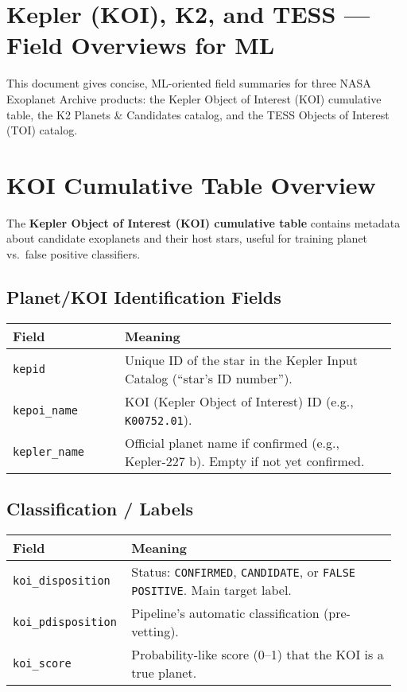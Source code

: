 \documentclass{article}
\begin{document}
\section*{Kepler (KOI), K2, and TESS --- Field Overviews for ML}

This document gives concise, ML-oriented field summaries for three NASA Exoplanet Archive products: the Kepler Object of Interest (KOI) cumulative table, the K2 Planets \& Candidates catalog, and the TESS Objects of Interest (TOI) catalog.

\section*{KOI Cumulative Table Overview}

The \textbf{Kepler Object of Interest (KOI) cumulative table} contains metadata about candidate exoplanets and their host stars, useful for training planet vs.\ false positive classifiers.

\subsection*{Planet/KOI Identification Fields}
\begin{tabular}{@{}p{0.28\linewidth} p{0.68\linewidth}@{}}
\toprule
\textbf{Field} & \textbf{Meaning} \\ \midrule
\texttt{kepid} & Unique ID of the star in the Kepler Input Catalog (``star's ID number''). \\
\texttt{kepoi\_name} & KOI (Kepler Object of Interest) ID (e.g., \texttt{K00752.01}). \\
\texttt{kepler\_name} & Official planet name if confirmed (e.g., Kepler-227 b). Empty if not yet confirmed. \\
\bottomrule
\end{tabular}

\subsection*{Classification / Labels}
\begin{tabular}{@{}p{0.28\linewidth} p{0.68\linewidth}@{}}
\toprule
\textbf{Field} & \textbf{Meaning} \\ \midrule
\texttt{koi\_disposition} & Status: \texttt{CONFIRMED}, \texttt{CANDIDATE}, or \texttt{FALSE POSITIVE}. Main target label. \\
\texttt{koi\_pdisposition} & Pipeline's automatic classification (pre-vetting). \\
\texttt{koi\_score} & Probability-like score (0--1) that the KOI is a true planet. \\
\bottomrule
\end{tabular}
\end{document}

